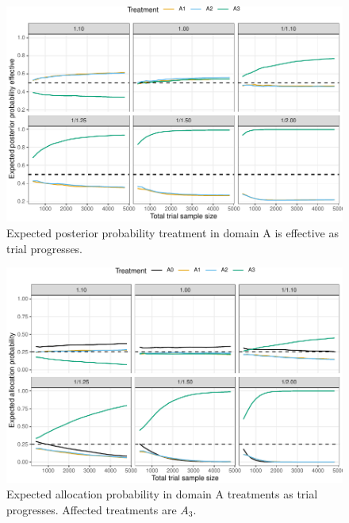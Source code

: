 \documentclass[
]{article}
\begin{document}
\begin{figure}
\centering
\includegraphics{ASCOT_simulations_5_files/figure-latex/unnamed-chunk-3-1.pdf}
\caption{\label{fig:unnamed-chunk-3}Expected posterior probability treatment in domain A is effective as trial progresses.}
\end{figure}

\begin{figure}
\centering
\includegraphics{ASCOT_simulations_5_files/figure-latex/fig6-1.pdf}
\caption{\label{fig:fig6}Expected allocation probability in domain A treatments as trial progresses. Affected treatments are \(A_3\).}
\end{figure}
\end{document}
